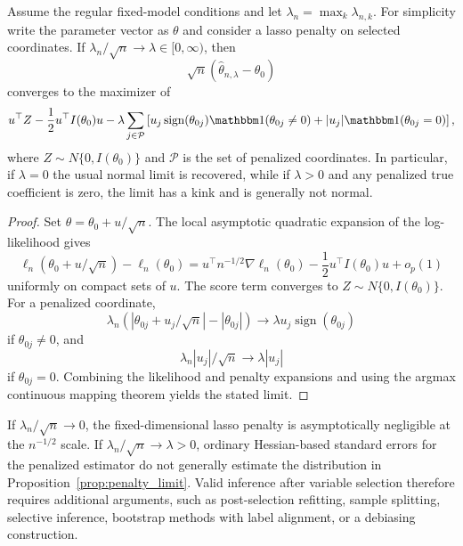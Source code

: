 \begin{proposition}
\label{prop:penalty_limit}
Assume the regular fixed-model conditions and let
\(\lambda_n=\max_k\lambda_{n,k}\).  For simplicity write the parameter vector as
\(\theta\) and consider a lasso penalty on selected coordinates.  If
\(\lambda_n/\sqrt n\to\lambda\in[0,\infty)\), then
\[
    \sqrt n(\hat\theta_{n,\lambda}-\theta_0)
\]
converges to the maximizer of
\[
    u^\top Z-\frac12 u^\top I(\theta_0)u
    -
    \lambda
    \sum_{j\in\mathcal P}
    \left[
        u_j\operatorname{sign}(\theta_{0j})\mathbbm 1(\theta_{0j}\neq 0)
        +
        |u_j|\mathbbm 1(\theta_{0j}=0)
    \right],
\]
where \(Z\sim N\{0,I(\theta_0)\}\) and \(\mathcal P\) is the set of penalized
coordinates.  In particular, if \(\lambda=0\) the usual normal limit is
recovered, while if \(\lambda>0\) and any penalized true coefficient is zero,
the limit has a kink and is generally not normal.
\end{proposition}

\begin{proof}
Set \(\theta=\theta_0+u/\sqrt n\).  The local asymptotic quadratic expansion of
the log-likelihood gives
\[
    \ell_n(\theta_0+u/\sqrt n)-\ell_n(\theta_0)
    =
    u^\top n^{-1/2}\nabla\ell_n(\theta_0)
    -
    \frac12 u^\top I(\theta_0)u
    +
    o_p(1)
\]
uniformly on compact sets of \(u\).  The score term converges to
\(Z\sim N\{0,I(\theta_0)\}\).  For a penalized coordinate,
\[
    \lambda_n\left(
        |\theta_{0j}+u_j/\sqrt n|-|\theta_{0j}|
    \right)
    \to
    \lambda u_j\operatorname{sign}(\theta_{0j})
\]
if \(\theta_{0j}\neq0\), and
\[
    \lambda_n|u_j|/\sqrt n\to \lambda |u_j|
\]
if \(\theta_{0j}=0\).  Combining the likelihood and penalty expansions and
using the argmax continuous mapping theorem yields the stated limit.
\end{proof}

\begin{corollary}
If \(\lambda_n/\sqrt n\to0\), the fixed-dimensional lasso penalty is
asymptotically negligible at the \(n^{-1/2}\) scale.  If
\(\lambda_n/\sqrt n\to\lambda>0\), ordinary Hessian-based standard errors for
the penalized estimator do not generally estimate the distribution in
Proposition~\ref{prop:penalty_limit}.  Valid inference after variable selection
therefore requires additional arguments, such as post-selection refitting,
sample splitting, selective inference, bootstrap methods with label alignment,
or a debiasing construction.
\end{corollary}

